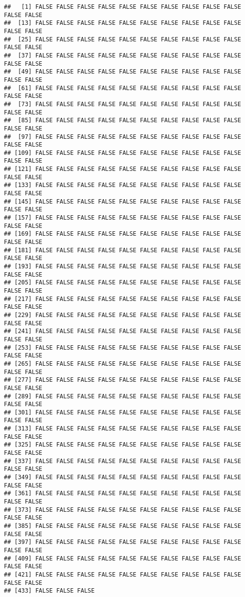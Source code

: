 \documentclass[
]{article}
\begin{document}
\begin{verbatim}
##   [1] FALSE FALSE FALSE FALSE FALSE FALSE FALSE FALSE FALSE FALSE FALSE FALSE
##  [13] FALSE FALSE FALSE FALSE FALSE FALSE FALSE FALSE FALSE FALSE FALSE FALSE
##  [25] FALSE FALSE FALSE FALSE FALSE FALSE FALSE FALSE FALSE FALSE FALSE FALSE
##  [37] FALSE FALSE FALSE FALSE FALSE FALSE FALSE FALSE FALSE FALSE FALSE FALSE
##  [49] FALSE FALSE FALSE FALSE FALSE FALSE FALSE FALSE FALSE FALSE FALSE FALSE
##  [61] FALSE FALSE FALSE FALSE FALSE FALSE FALSE FALSE FALSE FALSE FALSE FALSE
##  [73] FALSE FALSE FALSE FALSE FALSE FALSE FALSE FALSE FALSE FALSE FALSE FALSE
##  [85] FALSE FALSE FALSE FALSE FALSE FALSE FALSE FALSE FALSE FALSE FALSE FALSE
##  [97] FALSE FALSE FALSE FALSE FALSE FALSE FALSE FALSE FALSE FALSE FALSE FALSE
## [109] FALSE FALSE FALSE FALSE FALSE FALSE FALSE FALSE FALSE FALSE FALSE FALSE
## [121] FALSE FALSE FALSE FALSE FALSE FALSE FALSE FALSE FALSE FALSE FALSE FALSE
## [133] FALSE FALSE FALSE FALSE FALSE FALSE FALSE FALSE FALSE FALSE FALSE FALSE
## [145] FALSE FALSE FALSE FALSE FALSE FALSE FALSE FALSE FALSE FALSE FALSE FALSE
## [157] FALSE FALSE FALSE FALSE FALSE FALSE FALSE FALSE FALSE FALSE FALSE FALSE
## [169] FALSE FALSE FALSE FALSE FALSE FALSE FALSE FALSE FALSE FALSE FALSE FALSE
## [181] FALSE FALSE FALSE FALSE FALSE FALSE FALSE FALSE FALSE FALSE FALSE FALSE
## [193] FALSE FALSE FALSE FALSE FALSE FALSE FALSE FALSE FALSE FALSE FALSE FALSE
## [205] FALSE FALSE FALSE FALSE FALSE FALSE FALSE FALSE FALSE FALSE FALSE FALSE
## [217] FALSE FALSE FALSE FALSE FALSE FALSE FALSE FALSE FALSE FALSE FALSE FALSE
## [229] FALSE FALSE FALSE FALSE FALSE FALSE FALSE FALSE FALSE FALSE FALSE FALSE
## [241] FALSE FALSE FALSE FALSE FALSE FALSE FALSE FALSE FALSE FALSE FALSE FALSE
## [253] FALSE FALSE FALSE FALSE FALSE FALSE FALSE FALSE FALSE FALSE FALSE FALSE
## [265] FALSE FALSE FALSE FALSE FALSE FALSE FALSE FALSE FALSE FALSE FALSE FALSE
## [277] FALSE FALSE FALSE FALSE FALSE FALSE FALSE FALSE FALSE FALSE FALSE FALSE
## [289] FALSE FALSE FALSE FALSE FALSE FALSE FALSE FALSE FALSE FALSE FALSE FALSE
## [301] FALSE FALSE FALSE FALSE FALSE FALSE FALSE FALSE FALSE FALSE FALSE FALSE
## [313] FALSE FALSE FALSE FALSE FALSE FALSE FALSE FALSE FALSE FALSE FALSE FALSE
## [325] FALSE FALSE FALSE FALSE FALSE FALSE FALSE FALSE FALSE FALSE FALSE FALSE
## [337] FALSE FALSE FALSE FALSE FALSE FALSE FALSE FALSE FALSE FALSE FALSE FALSE
## [349] FALSE FALSE FALSE FALSE FALSE FALSE FALSE FALSE FALSE FALSE FALSE FALSE
## [361] FALSE FALSE FALSE FALSE FALSE FALSE FALSE FALSE FALSE FALSE FALSE FALSE
## [373] FALSE FALSE FALSE FALSE FALSE FALSE FALSE FALSE FALSE FALSE FALSE FALSE
## [385] FALSE FALSE FALSE FALSE FALSE FALSE FALSE FALSE FALSE FALSE FALSE FALSE
## [397] FALSE FALSE FALSE FALSE FALSE FALSE FALSE FALSE FALSE FALSE FALSE FALSE
## [409] FALSE FALSE FALSE FALSE FALSE FALSE FALSE FALSE FALSE FALSE FALSE FALSE
## [421] FALSE FALSE FALSE FALSE FALSE FALSE FALSE FALSE FALSE FALSE FALSE FALSE
## [433] FALSE FALSE FALSE
\end{verbatim}
\end{document}
